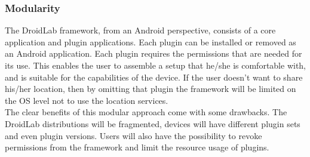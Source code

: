 \documentclass[conference,letterpaper]{IEEEtran}
\begin{document}
\subsubsection{Modularity}
The DroidLab framework, from an Android perspective, consists of a core application and plugin applications. Each plugin can be installed or removed as an Android application. Each plugin requires the permissions that are needed for its use. This enables the user to assemble a setup that he/she is comfortable with, and is suitable for the capabilities of the device. If the user doesn't want to share his/her location, then by omitting that plugin the framework will be limited on the OS level not to use the location services.\\
\indent The clear benefits of this modular approach come with some drawbacks. The DroidLab distributions will be fragmented, devices will have different plugin sets and even plugin versions. Users will also have the possibility to revoke permissions from the framework and limit the resource usage of plugins.
\end{document}
